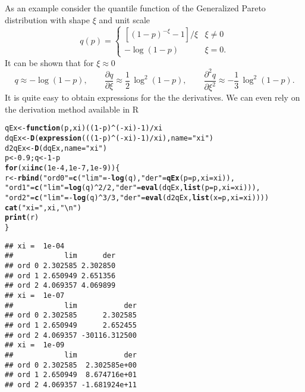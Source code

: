 \documentclass[11pt]{article}\usepackage[]{graphicx}\usepackage[]{xcolor}
\makeatletter
\newcommand{\hlnum}[1]{\textcolor[rgb]{0.686,0.059,0.569}{#1}}%
\newcommand{\hlstr}[1]{\textcolor[rgb]{0.192,0.494,0.8}{#1}}%
\newcommand{\hlopt}[1]{\textcolor[rgb]{0,0,0}{#1}}%
\newcommand{\hlstd}[1]{\textcolor[rgb]{0.345,0.345,0.345}{#1}}%
\newcommand{\hlkwa}[1]{\textcolor[rgb]{0.161,0.373,0.58}{\textbf{#1}}}%
\newcommand{\hlkwb}[1]{\textcolor[rgb]{0.69,0.353,0.396}{#1}}%
\newcommand{\hlkwc}[1]{\textcolor[rgb]{0.333,0.667,0.333}{#1}}%
\newcommand{\hlkwd}[1]{\textcolor[rgb]{0.737,0.353,0.396}{\textbf{#1}}}%
\newenvironment{kframe}{%
 \def\at@end@of@kframe{}%
 \ifinner\ifhmode%
  \def\at@end@of@kframe{\end{minipage}}%
  \begin{minipage}{\columnwidth}%
 \fi\fi%
 \def\FrameCommand##1{\hskip\@totalleftmargin \hskip-\fboxsep
 \colorbox{shadecolor}{##1}\hskip-\fboxsep
     \hskip-\linewidth \hskip-\@totalleftmargin \hskip\columnwidth}%
 \MakeFramed {\advance\hsize-\width
   \@totalleftmargin\z@ \linewidth\hsize
   \@setminipage}}%
 {\par\unskip\endMakeFramed%
 \at@end@of@kframe}
\newenvironment{knitrout}{}{} %
\makeatother
\begin{document}
As an example consider the quantile function of the Generalized Pareto
distribution with shape $\xi$ and unit scale 
$$
q(p) = \begin{cases}
  [(1 - p)^{-\xi} - 1] / \xi & \xi \neq 0 \\
  -\log(1 - p) & \xi = 0.
\end{cases}
$$
It can be shown that for $\xi \approx 0$
$$
q \approx - \log(1-p), \qquad
\frac{\partial q}{\partial \xi} \approx \frac{1}{2}\, \log^2(1-p), \qquad
\frac{\partial^2 q}{\partial \xi^2} \approx -\frac{1}{3}\, \log^2(1-p).
$$
It is quite easy to obtain expressions for the the derivatives. We can even
rely on the derivation method \verb@D@ available in R
\begin{knitrout}\footnotesize
{}\color{fgcolor}\begin{kframe}
\begin{alltt}
\hlstd{qEx} \hlkwb{<-} \hlkwa{function}\hlstd{(}\hlkwc{p}\hlstd{,} \hlkwc{xi}\hlstd{) ((}\hlnum{1} \hlopt{-} \hlstd{p)}\hlopt{^}\hlstd{(}\hlopt{-}\hlstd{xi)} \hlopt{-} \hlnum{1}\hlstd{)} \hlopt{/} \hlstd{xi}
\hlstd{dqEx} \hlkwb{<-} \hlkwd{D}\hlstd{(}\hlkwd{expression}\hlstd{(((}\hlnum{1} \hlopt{-} \hlstd{p)}\hlopt{^}\hlstd{(}\hlopt{-}\hlstd{xi)} \hlopt{-} \hlnum{1}\hlstd{)} \hlopt{/} \hlstd{xi),} \hlkwc{name} \hlstd{=} \hlstr{"xi"}\hlstd{)}
\hlstd{d2qEx} \hlkwb{<-} \hlkwd{D}\hlstd{(dqEx,} \hlkwc{name} \hlstd{=} \hlstr{"xi"}\hlstd{)}
\hlstd{p} \hlkwb{<-} \hlnum{0.9}\hlstd{; q} \hlkwb{<-} \hlnum{1} \hlopt{-} \hlstd{p}
\hlkwa{for} \hlstd{(xi} \hlkwa{in} \hlkwd{c}\hlstd{(}\hlnum{1e-4}\hlstd{,} \hlnum{1e-7}\hlstd{,} \hlnum{1e-9}\hlstd{)) \{}
    \hlstd{r} \hlkwb{<-} \hlkwd{rbind}\hlstd{(}\hlstr{"ord 0"} \hlstd{=} \hlkwd{c}\hlstd{(}\hlstr{"lim"} \hlstd{=} \hlopt{-}\hlkwd{log}\hlstd{(q),} \hlstr{"der"} \hlstd{=} \hlkwd{qEx}\hlstd{(}\hlkwc{p} \hlstd{= p,} \hlkwc{xi} \hlstd{= xi)),}
               \hlstr{"ord 1"} \hlstd{=} \hlkwd{c}\hlstd{(}\hlstr{"lim"} \hlstd{=} \hlkwd{log}\hlstd{(q)}\hlopt{^}\hlnum{2} \hlopt{/} \hlnum{2}\hlstd{,} \hlstr{"der"} \hlstd{=} \hlkwd{eval}\hlstd{(dqEx,} \hlkwd{list}\hlstd{(}\hlkwc{p} \hlstd{= p,} \hlkwc{xi} \hlstd{= xi))),}
               \hlstr{"ord 2"} \hlstd{=} \hlkwd{c}\hlstd{(}\hlstr{"lim"} \hlstd{=} \hlopt{-}\hlkwd{log}\hlstd{(q)}\hlopt{^}\hlnum{3} \hlopt{/} \hlnum{3}\hlstd{,} \hlstr{"der"} \hlstd{=} \hlkwd{eval}\hlstd{(d2qEx,} \hlkwd{list}\hlstd{(}\hlkwc{x} \hlstd{= p,} \hlkwc{xi} \hlstd{= xi))))}
    \hlkwd{cat}\hlstd{(}\hlstr{"xi = "}\hlstd{, xi,} \hlstr{"\textbackslash{}n"}\hlstd{)}
    \hlkwd{print}\hlstd{(r)}
\hlstd{\}}
\end{alltt}
\begin{verbatim}
## xi =  1e-04 
##            lim      der
## ord 0 2.302585 2.302850
## ord 1 2.650949 2.651356
## ord 2 4.069357 4.069899
## xi =  1e-07 
##            lim           der
## ord 0 2.302585      2.302585
## ord 1 2.650949      2.652455
## ord 2 4.069357 -30116.312500
## xi =  1e-09 
##            lim           der
## ord 0 2.302585  2.302585e+00
## ord 1 2.650949  8.674716e+01
## ord 2 4.069357 -1.681924e+11
\end{verbatim}
\end{kframe}
\end{knitrout}
\end{document}
